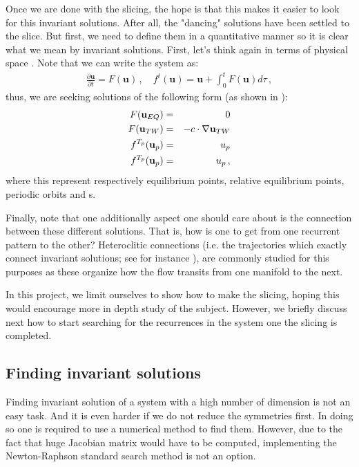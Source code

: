 Once we are done with the slicing, the hope is that this makes it easier to look for this invariant solutions. After all, the "dancing" solutions have been settled to the slice. But first, we need to define them in a quantitative manner so it is clear what we mean by invariant solutions. First, let's think again in terms of physical space . Note that we can write the system as:
\begin{eqnarray}
\frac{\partial \textbf{u}}{\partial t}
=F(\textbf{u})
    \,,\quad
f^{t}(\textbf{u})=\textbf{u}+\int_{0}^{t}{F(\textbf{u}) d \tau}
\,,
\label{NS4}
\end{eqnarray}
thus, we are seeking solutions of the following form (as shown in ):
\begin{eqnarray}
F(\textbf{u}_{EQ}) &=& 0 \nonumber \\ 
F(\textbf{u}_{TW}) &=& -c \cdot \nabla \textbf{u}_{TW} \nonumber \\ 
f^{T_p}(\textbf{u}_{p}) &=& u_p \nonumber \\ 
f^{T_p}(\textbf{u}_{p}) &=& u_p
\,,
\label{NS_Solutions}
\end{eqnarray}
where this represent respectively equilibrium points, relative equilibrium points, periodic orbits
and \rpo s.

Finally, note that one additionally aspect  one should care about is the
connection between these different solutions. That is, how is one to get
from one recurrent pattern to the other? Heteroclitic connections (i.e. the trajectories which exactly connect invariant
solutions; see for instance ), are commonly studied for this purposes as these organize
how the flow transits from one manifold to the next.

In this project, we limit ourselves to show how to make the slicing, hoping this would encourage more in depth study of the subject. However, we briefly discuss next how to start searching for the recurrences in the system one the slicing is completed.

\subsection{Finding invariant solutions}

Finding invariant solution of a system with a high number of dimension is not an easy task. And it is even harder if we do not reduce the symmetries first. In doing so one is required to use a numerical method to find them. However, due to the fact that huge Jacobian matrix would have to be computed, implementing the Newton-Raphson standard search method is not an option.

